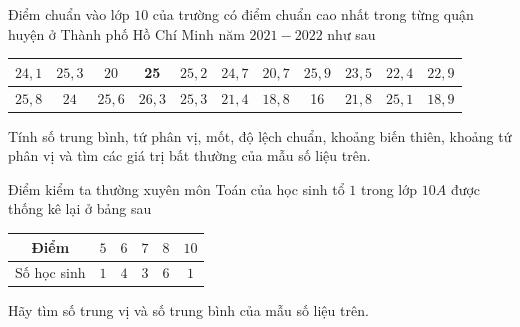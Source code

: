 \begin{bt}%
	Điểm chuẩn vào lớp $ 10 $	của trường có điểm chuẩn cao nhất trong từng quận huyện ở Thành phố Hồ Chí Minh năm $ 2021-2022 $ như sau
	\begin{center}
		\begin{tabular}{|c|c|c|c|c|c|c|c|c|c|c|}
			\hline
			$ 24{,}1 $ &$ 25{,}3 $ &$ 20$& 25&$ 25{,}2 $ &$ 24{,}7 $ &$ 20{,}7 $ &$ 25{,}9 $&$ 23{,}5 $ &$ 22{,}4 $ &$ 22{,}9 $   \\
			\hline
			$ 25{,}8 $ & $ 24$ & $ 25{,}6 $& $ 26{,}3 $ & $ 25{,}3 $ & $ 21{,}4 $ &$ 18{,}8 $ &16 & $ 21{,}8 $&$ 25{,}1 $ &$ 18{,}9 $ \\
			\hline
		\end{tabular}
	\end{center}
	Tính số trung bình, tứ phân vị, mốt, độ lệch chuẩn, khoảng biến thiên, khoảng tứ phân vị và tìm các giá trị bất thường của mẫu số liệu trên.
\end{bt}

\begin{bt}%
	Điểm kiểm ta thường xuyên môn Toán của học sinh tổ $ 1 $ trong lớp $ 10A $ được thống kê lại ở bảng sau
	\begin{center}
		\begin{tabular}{|c|c|c|c|c|c|}
			\hline
			Điểm  &$5 $ &$6$ &$ 7 $ &$8 $ &$10 $\\
			\hline
			Số học sinh & $1$ & $ 4 $& $ 3 $ & $ 6$ & $ 1 $ \\
			\hline
		\end{tabular}
	\end{center}
	Hãy tìm số trung vị và số trung bình của mẫu số liệu trên.
\end{bt}

